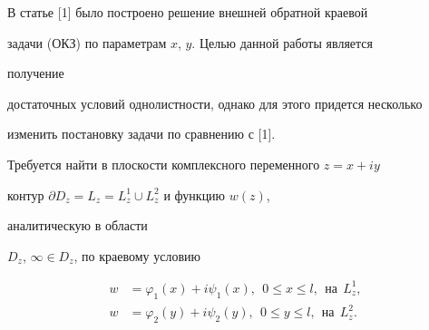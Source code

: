  


\date{} 




\pagestyle{plain} %


 




\maketitle 


\label{begin} 


 


 


В статье [1] было построено решение внешней обратной краевой  


задачи (ОКЗ) по параметрам $x$, $y$. Целью данной работы является 


получение  


достаточных условий однолистности, однако для этого придется несколько  


изменить постановку задачи по сравнению с [1]. 


 


Требуется найти в плоскости комплексного переменного $z=x+iy$ 


контур $\partial D_z=L_z=L^1_z\cup L^2_z$ и функцию $w(z)$, 


аналитическую в области  


$D_z$, $\infty\in D_z$, по краевому условию 


\begin{equation} 


\begin{split} 


w&=\varphi_1(x)+i\psi_1(x),\ \ 0\le x\le l, 


\ \ \text{на}\ \ L^1_z, \\ 


% 


w&=\varphi_2(y)+i\psi_2(y),\ \ 0\le y\le l, 


\ \ \text{на}\ \ L^2_z. 


\end{split} 


\end{equation} 


 


